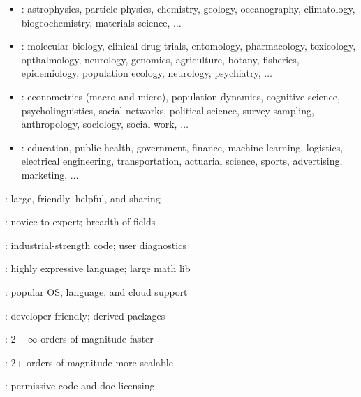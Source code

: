 \documentclass[10pt]{report}
\begin{document}
%
\begin{itemize}
\item {}: {\footnotesize
astrophysics, particle physics, chemistry, geology, oceanography,
climatology, biogeochemistry, materials science, $\ldots$
}
\item {}: {\footnotesize
molecular biology, clinical drug trials, entomology, pharmacology,
toxicology, opthalmology, neurology, genomics, agriculture, botany, fisheries,
epidemiology, population ecology, neurology, psychiatry, $\ldots$
}
\vspace*{-3pt}
\item {}: {\footnotesize
 econometrics (macro and micro), population dynamics, cognitive
 science, psycholinguistics, social networks, political science,
 survey sampling, anthropology, sociology, social work, $\ldots$
}
\vspace*{-3pt}
\item {}: {\footnotesize education, public health,
government, finance, machine learning, logistics, electrical engineering,  transportation, actuarial science, sports, advertising, marketing, $\ldots$}
\end{itemize}

\begin{subitemize}
\item {}: large, friendly, helpful, and sharing
\item {}:  novice to expert; breadth of fields
\item {}:  industrial-strength code; user diagnostics
\item {}:  highly expressive language;  large math lib
\item {}: popular OS, language, and cloud support
\item {}: developer friendly; derived packages
\item {}:  $2-\infty$ orders of magnitude faster
\item {}:  2+ orders of magnitude more scalable
\item {}: permissive code and doc licensing
\end{subitemize}

\end{document}
